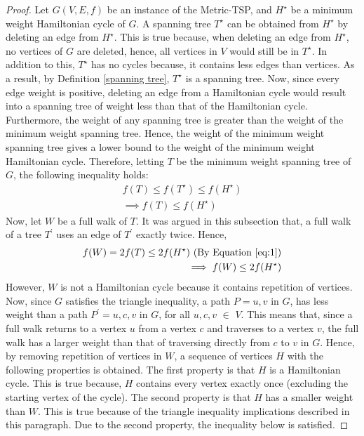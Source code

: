 \documentclass[12pt]{article}
\numberwithin{equation}{subsection}
\numberwithin{table}{subsection}
\numberwithin{algorithm}{subsection}
\numberwithin{figure}{subsection}
\begin{document}
\begin{proof}
Let $G(V,E,f)$ be an instance of the Metric-TSP, and $H^\star$ be a minimum weight Hamiltonian cycle of $G$. A spanning tree $T^\star$ can be obtained from $H^\star$ by deleting an edge from $H^\star$. This is true because, when deleting an edge from $H^\star$, no vertices of $G$ are deleted, hence, all vertices in $V$ would still be in $T^\star$. In addition to this, $T^\star$ has no cycles because, it contains less edges than vertices. As a result, by Definition \ref{spanning tree}, $T^\star$ is a spanning tree. Now, since every edge weight is positive, deleting an edge from a Hamiltonian cycle would result into a spanning tree of weight less than that of the Hamiltonian cycle. Furthermore, the weight of any spanning tree is greater than the weight of the minimum weight spanning tree. Hence, the weight of the minimum weight spanning tree gives a lower bound to the weight of the minimum weight Hamiltonian cycle. Therefore, letting $T$ be the minimum weight spanning tree of $G$, the following inequality holds:
\begin{equation}
\begin{split}
    \label{eq:1}
    f(T) \leq f(T^\star) \leq f(H^\star)\\
    \implies f(T) \leq f(H^\star)
 \end{split}
 \end{equation}
Now, let $W$ be a full walk of $T$. It was argued in this subsection that, a full walk of a tree $T^\prime$ uses an edge of $T^\prime$ exactly twice. Hence,
\begin{equation}
\begin{split}
    \label{eq:2}
    f(W) = 2f(T) \leq 2f(H^\star) \text{ (By Equation \ref{eq:1})}\\
    \implies f(W) \leq 2f(H^\star)
 \end{split}
 \end{equation}
However, $W$ is not a Hamiltonian cycle because it contains repetition of vertices. Now, since $G$ satisfies the triangle inequality, a path $P = u, v$ in $G$, has less weight than a path $P^\prime = u, c, v$ in $G$, for all $u, c, v$ $\in$ $V$. This means that, since a full walk returns to a vertex $u$ from a vertex $c$ and traverses to a vertex $v$, the full walk has a larger weight than that of traversing directly from $c$ to $v$ in $G$. Hence, by removing repetition of vertices in $W$, a sequence of vertices $H$ with the following properties is obtained. The first property is that $H$ is a Hamiltonian cycle. This is true because, $H$ contains every vertex exactly once (excluding the starting vertex of the cycle). The second property is that $H$ has a smaller weight than $W$. This is true because of the triangle inequality implications described in this paragraph. Due to the second property, the inequality below is satisfied.

\end{proof}
\end{document}

